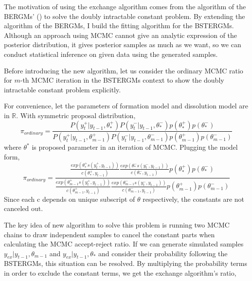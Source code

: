 \documentclass[a4paper, 11pt]{report}
\theoremstyle{definition}
\begin{document}
The motivation of using the exchange algorithm comes from the algorithm of the BERGMs' (\cite{RN115})
to solve the doubly intractable constant problem. By extending the algorithm of the BERGMs,
I build the fitting algorithm for the BSTERGMs.
Although an approach using MCMC cannot give an analytic expression of the posterior distribution, 
it gives posterior samples as much as we want, so we can conduct statistical inference on given data using the generated samples.

Before introducing the new algorithm,
let us consider the ordinary MCMC ratio for $m$-th MCMC iteration in the BSTERGMs context
to show the doubly intractable constant problem explicitly.

For convenience, let the parameters of formation model and dissolution model are in $\mathbb{R}$.
With symmetric proposal distribution,
\[\pi_{ordinary} = \frac{P(y_t^+|y_{t-1},\theta_*^+)P(y_t^-|y_{t-1},\theta_*^-)p(\theta_*^+)p(\theta_*^-)}
{P(y_t^+|y_{t-1},\theta_{m-1}^+)P(y_t^-|y_{t-1},\theta_{m-1}^-)p(\theta_{m-1}^+)p(\theta_{m-1}^-)}\]
where $\theta^*$ is proposed parameter in an iteration of MCMC.
Plugging the model form,
\[\pi_{ordinary} = \frac{\frac{exp(\theta_*^+ s(y_t^+,y_{t-1}))}{c(\theta_*^+, y_{t-1})} \frac{exp(\theta_*^- s(y_t^-, y_{t-1}))}{c(\theta_*^-, y_{t-1})} p(\theta_*^+)p(\theta_*^-)}
    {\frac{exp(\theta_{m-1}^+ s(y_t^+, y_{t-1}))}{c(\theta_{m-1}^+, y_{t-1})} \frac{exp(\theta_{m-1}^- s(y_t^-, y_{t-1}))}{c(\theta_{m-1}^-,y_{t-1})} p(\theta_{m-1}^+)p(\theta_{m-1}^-)}\]
Since each c depends on unique subscript of $\theta$ respectively, the constants are not canceled out.

The key idea of new algorithm to solve this problem is running two MCMC chains to draw independent samples to cancel the constant parts
when calculating the MCMC accept-reject ratio. If we can generate simulated samples $y_{ex}|y_{t-1},\theta_{m-1}$ and $y_{ex}|y_{t-1},\theta_*$ and
consider their probability following the BSTERGMs, this situation can be resolved.
By multiplying the probability terms in order to exclude the constant terms,
we get the exchange algorithm's ratio,
\end{document}
